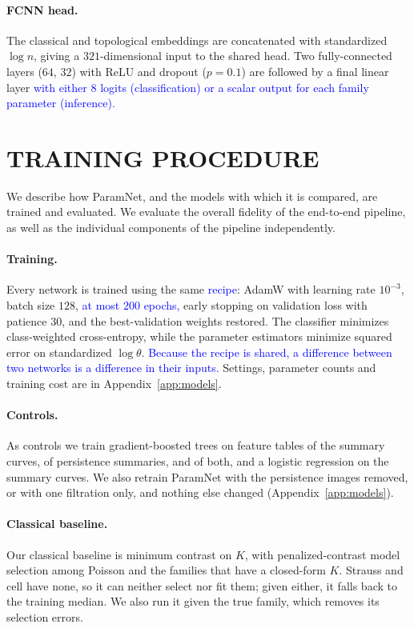 \documentclass[twoside]{article}
\newcommand{\review}[1]{\textcolor{blue}{#1}}
\begin{document}
\paragraph{FCNN head.}
The classical and topological embeddings are concatenated with standardized $\log n$, giving a $321$-dimensional input to the shared head. Two fully-connected layers ($64$, $32$) with ReLU and dropout ($p=0.1$) are followed by a final linear layer \review{with either $8$ logits (classification) or a scalar output for each family parameter (inference).}


\section{TRAINING PROCEDURE}
\label{sec:training}

We describe how ParamNet, and the models with which it is compared, are trained and evaluated. We evaluate the overall fidelity of the end-to-end pipeline, as well as the individual components of the pipeline independently.

\paragraph{Training.}
Every network is trained using the same \review{recipe}: AdamW with learning rate $10^{-3}$, batch size $128$, \review{at most $200$
epochs,} early stopping on validation loss with patience $30$, and the best-validation weights restored. The
classifier minimizes class-weighted cross-entropy, while the parameter estimators minimize squared error on standardized $\log\theta$.
\review{Because the recipe is shared, a difference between two networks is a difference in their inputs.} Settings, parameter
counts and training cost are in Appendix~\ref{app:models}.

\paragraph{Controls.}
\label{sec:learners}
As controls we train gradient-boosted trees on feature tables of the summary curves, of persistence summaries, and of
both, and a logistic regression on the summary curves. We also retrain ParamNet with the persistence images removed,
or with one filtration only, and nothing else changed (Appendix~\ref{app:models}).

\paragraph{Classical baseline.} Our classical baseline is minimum contrast on $K$, with penalized-contrast model
selection among Poisson and the families that have a closed-form $K$. Strauss and cell have none, so it can neither
select nor fit them; given either, it falls back to the training median. We also run it given the true family, which
removes its selection errors.
\end{document}
